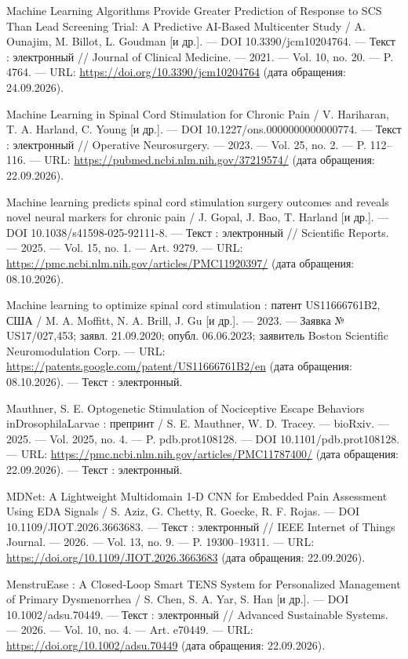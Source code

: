 \begin{list}{}{\setlength{\leftmargin}{10mm}\setlength{\labelwidth}{8mm}\setlength{\labelsep}{2mm}\setlength{\itemsep}{0pt}\setlength{\parsep}{0pt}\setlength{\topsep}{0pt}}
\item[178.] Machine Learning Algorithms Provide Greater Prediction of Response to SCS Than Lead Screening Trial: A Predictive AI-Based Multicenter Study / A. Ounajim, M. Billot, L. Goudman [и др.]. — DOI 10.3390/jcm10204764. — Текст : электронный // Journal of Clinical Medicine. — 2021. — Vol. 10, no. 20. — P. 4764. — URL: \url{https://doi.org/10.3390/jcm10204764} (дата обращения: 24.09.2026).
\item[179.] Machine Learning in Spinal Cord Stimulation for Chronic Pain / V. Hariharan, T. A. Harland, C. Young [и др.]. — DOI 10.1227/ons.0000000000000774. — Текст : электронный // Operative Neurosurgery. — 2023. — Vol. 25, no. 2. — P. 112–116. — URL: \url{https://pubmed.ncbi.nlm.nih.gov/37219574/} (дата обращения: 22.09.2026).
\item[180.] Machine learning predicts spinal cord stimulation surgery outcomes and reveals novel neural markers for chronic pain / J. Gopal, J. Bao, T. Harland [и др.]. — DOI 10.1038/s41598-025-92111-8. — Текст : электронный // Scientific Reports. — 2025. — Vol. 15, no. 1. — Art. 9279. — URL: \url{https://pmc.ncbi.nlm.nih.gov/articles/PMC11920397/} (дата обращения: 08.10.2026).
\item[181.] Machine learning to optimize spinal cord stimulation : патент US11666761B2, США / M. A. Moffitt, N. A. Brill, J. Gu [и др.]. — 2023. — Заявка № US17/027,453; заявл. 21.09.2020; опубл. 06.06.2023; заявитель Boston Scientific Neuromodulation Corp. — URL: \url{https://patents.google.com/patent/US11666761B2/en} (дата обращения: 08.10.2026). — Текст : электронный.
\item[182.] Mauthner, S. E. Optogenetic Stimulation of Nociceptive Escape Behaviors inDrosophilaLarvae : препринт / S. E. Mauthner, W. D. Tracey. — bioRxiv. — 2025. — Vol. 2025, no. 4. — P. pdb.prot108128. — DOI 10.1101/pdb.prot108128. — URL: \url{https://pmc.ncbi.nlm.nih.gov/articles/PMC11787400/} (дата обращения: 22.09.2026). — Текст : электронный.
\item[183.] MDNet: A Lightweight Multidomain 1-D CNN for Embedded Pain Assessment Using EDA Signals / S. Aziz, G. Chetty, R. Goecke, R. F. Rojas. — DOI 10.1109/JIOT.2026.3663683. — Текст : электронный // IEEE Internet of Things Journal. — 2026. — Vol. 13, no. 9. — P. 19300–19311. — URL: \url{https://doi.org/10.1109/JIOT.2026.3663683} (дата обращения: 22.09.2026).
\item[184.] MenstruEase : A Closed‐Loop Smart TENS System for Personalized Management of Primary Dysmenorrhea / S. Chen, S. A. Yar, S. Han [и др.]. — DOI 10.1002/adsu.70449. — Текст : электронный // Advanced Sustainable Systems. — 2026. — Vol. 10, no. 4. — Art. e70449. — URL: \url{https://doi.org/10.1002/adsu.70449} (дата обращения: 22.09.2026).

\end{list}
